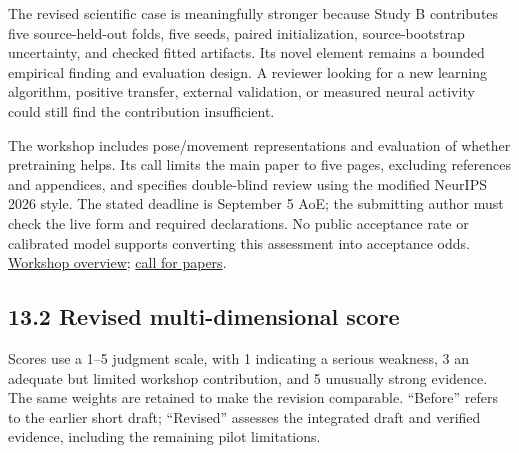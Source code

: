 \documentclass[11pt,letterpaper]{article}
\begin{document}
The revised scientific case is meaningfully stronger because Study B
contributes five source-held-out folds, five seeds, paired
initialization, source-bootstrap uncertainty, and checked fitted
artifacts. Its novel element remains a bounded empirical finding and
evaluation design. A reviewer looking for a new learning algorithm,
positive transfer, external validation, or measured neural activity
could still find the contribution insufficient.

The workshop includes pose/movement representations and evaluation of
whether pretraining helps. Its call limits the main paper to five pages,
excluding references and appendices, and specifies double-blind review
using the modified NeurIPS 2026 style. The stated deadline is September
5 AoE; the submitting author must check the live form and required
declarations. No public acceptance rate or calibrated model supports
converting this assessment into acceptance odds.
\href{https://brainbodyfm-workshop.github.io/}{Workshop overview};
\href{https://brainbodyfm-workshop.github.io/call-for-papers.html}{call
for papers}.

\subsection{13.2 Revised multi-dimensional
score}\label{revised-multi-dimensional-score}

Scores use a 1--5 judgment scale, with 1 indicating a serious weakness,
3 an adequate but limited workshop contribution, and 5 unusually strong
evidence. The same weights are retained to make the revision comparable.
``Before'' refers to the earlier short draft; ``Revised'' assesses the
integrated draft and verified evidence, including the remaining pilot
limitations.
\end{document}

